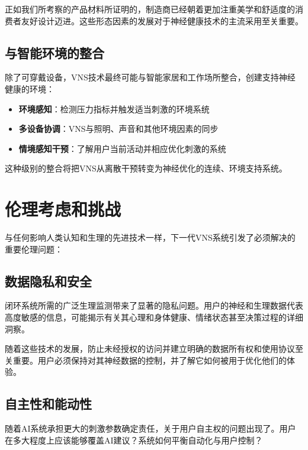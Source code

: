 \documentclass[
  Letterpaper,
]{scrbook}
\providecommand{\tightlist}{%
  \setlength{\itemsep}{0pt}\setlength{\parskip}{0pt}}\usepackage{longtable,booktabs,array}
\begin{document}
正如我们所考察的产品材料所证明的，制造商已经朝着更加注重美学和舒适度的消费者友好设计迈进。这些形态因素的发展对于神经健康技术的主流采用至关重要。

\subsection{与智能环境的整合}\label{ux4e0eux667aux80fdux73afux5883ux7684ux6574ux5408}

除了可穿戴设备，VNS技术最终可能与智能家居和工作场所整合，创建支持神经健康的环境：

\begin{itemize}
\tightlist
\item
  \textbf{环境感知}：检测压力指标并触发适当刺激的环境系统
\item
  \textbf{多设备协调}：VNS与照明、声音和其他环境因素的同步
\item
  \textbf{情境感知干预}：了解用户当前活动并相应优化刺激的系统
\end{itemize}

这种级别的整合将把VNS从离散干预转变为神经优化的连续、环境支持系统。

\section{伦理考虑和挑战}\label{ux4f26ux7406ux8003ux8651ux548cux6311ux6218}

与任何影响人类认知和生理的先进技术一样，下一代VNS系统引发了必须解决的重要伦理问题：

\subsection{数据隐私和安全}\label{ux6570ux636eux9690ux79c1ux548cux5b89ux5168}

闭环系统所需的广泛生理监测带来了显著的隐私问题。用户的神经和生理数据代表高度敏感的信息，可能揭示有关其心理和身体健康、情绪状态甚至决策过程的详细洞察。

随着这些技术的发展，防止未经授权的访问并建立明确的数据所有权和使用协议至关重要。用户必须保持对其神经数据的控制，并了解它如何被用于优化他们的体验。

\subsection{自主性和能动性}\label{ux81eaux4e3bux6027ux548cux80fdux52a8ux6027}

随着AI系统承担更大的刺激参数确定责任，关于用户自主权的问题出现了。用户在多大程度上应该能够覆盖AI建议？系统如何平衡自动化与用户控制？
\end{document}
